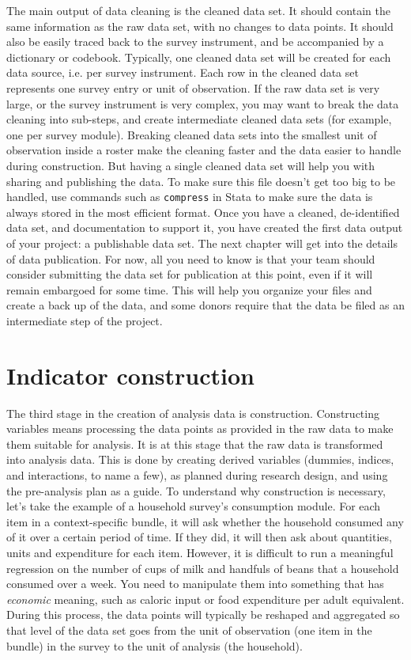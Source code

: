 The main output of data cleaning is the cleaned data set. 
It should contain the same information as the raw data set,
with no changes to data points.
It should also be easily traced back to the survey instrument,
and be accompanied by a dictionary or codebook.
Typically, one cleaned data set will be created for each data source,
i.e. per survey instrument.
Each row in the cleaned data set represents one survey entry or unit of observation.
If the raw data set is very large, or the survey instrument is very complex,
you may want to break the data cleaning into sub-steps, 
and create intermediate cleaned data sets
(for example, one per survey module).
Breaking cleaned data sets into the smallest unit of observation inside a roster
make the cleaning faster and the data easier to handle during construction.
But having a single cleaned data set will help you with sharing and publishing the data.
To make sure this file doesn't get too big to be handled,
use commands such as \texttt{compress} in Stata to make sure the data
is always stored in the most efficient format.
Once you have a cleaned, de-identified data set, and documentation to support it, 
you have created the first data output of your project:
a publishable data set.
The next chapter will get into the details of data publication.
For now, all you need to know is that your team should consider submitting the data set for publication at this point,
even if it will remain embargoed for some time.
This will help you organize your files and create a back up of the data,
and some donors require that the data be filed as an intermediate step of the project.

\section{Indicator construction}

The third stage in the creation of analysis data is construction.
Constructing variables means processing the data points as provided in the raw data to make them suitable for analysis.
It is at this stage that the raw data is transformed into analysis data.
This is done by creating derived variables (dummies, indices, and interactions, to name a few), 
as planned during research design, and using the pre-analysis plan as a guide.
To understand why construction is necessary,
let's take the example of a household survey's consumption module.
For each item in a context-specific bundle, it will ask whether the household consumed any of it over a certain period of time.
If they did, it will then ask about quantities, units and expenditure for each item.
However, it is difficult to run a meaningful regression on the number of cups of milk and handfuls of beans that a household consumed over a week.
You need to manipulate them into something that has \textit{economic} meaning,
such as caloric input or food expenditure per adult equivalent. 
During this process, the data points will typically be reshaped and aggregated 
so that level of the data set goes from the unit of observation (one item in the bundle) in the survey to the unit of analysis (the household). 

